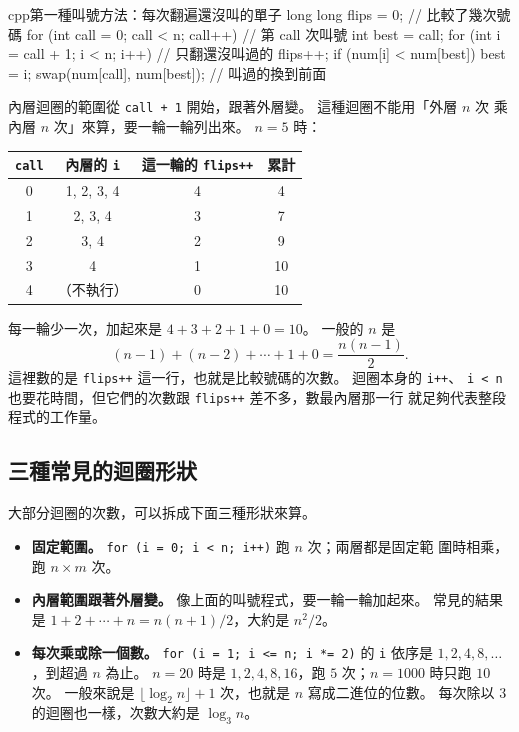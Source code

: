 \begin{code}[label=code:call-loop]{cpp}{第一種叫號方法：每次翻遍還沒叫的單子}
long long flips = 0;                      // 比較了幾次號碼
for (int call = 0; call < n; call++) {    // 第 call 次叫號
    int best = call;
    for (int i = call + 1; i < n; i++) {  // 只翻還沒叫過的
        flips++;
        if (num[i] < num[best]) {
            best = i;
        }
    }
    swap(num[call], num[best]);           // 叫過的換到前面
}
\end{code}

內層迴圈的範圍從 \texttt{call + 1} 開始，跟著外層變。 這種迴圈不能用「外層 $n$ 次
乘內層 $n$ 次」來算，要一輪一輪列出來。 $n = 5$ 時：

\begin{center}
\begin{tabular}{cccc}
\toprule
\texttt{call} & 內層的 \texttt{i} & 這一輪的 \texttt{flips++} & 累計 \\
\midrule
0 & 1, 2, 3, 4 & 4 & 4 \\
1 & 2, 3, 4 & 3 & 7 \\
2 & 3, 4 & 2 & 9 \\
3 & 4 & 1 & 10 \\
4 & （不執行） & 0 & 10 \\
\bottomrule
\end{tabular}
\end{center}

每一輪少一次，加起來是 $4 + 3 + 2 + 1 + 0 = 10$。 一般的 $n$ 是
\[
(n - 1) + (n - 2) + \cdots + 1 + 0 = \frac{n(n - 1)}{2}.
\]
這裡數的是 \texttt{flips++} 這一行，也就是比較號碼的次數。 迴圈本身的 \texttt{i++}、
\texttt{i < n} 也要花時間，但它們的次數跟 \texttt{flips++} 差不多，數最內層那一行
就足夠代表整段程式的工作量。

\subsection{三種常見的迴圈形狀}

大部分迴圈的次數，可以拆成下面三種形狀來算。

\begin{itemize}
\item \textbf{固定範圍。} \texttt{for (i = 0; i < n; i++)} 跑 $n$ 次；兩層都是固定範
圍時相乘，跑 $n \times m$ 次。
\item \textbf{內層範圍跟著外層變。} 像上面的叫號程式，要一輪一輪加起來。 常見的結果
是 $1 + 2 + \cdots + n = n(n + 1)/2$，大約是 $n^2/2$。
\item \textbf{每次乘或除一個數。} \texttt{for (i = 1; i <= n; i *= 2)} 的 \texttt{i}
依序是 $1, 2, 4, 8, \ldots$，到超過 $n$ 為止。 $n = 20$ 時是 $1, 2, 4, 8, 16$，跑
$5$ 次；$n = 1000$ 時只跑 $10$ 次。 一般來說是 $\lfloor \log_2 n \rfloor + 1$
次，也就是 $n$ 寫成二進位的位數。 每次除以 $3$ 的迴圈也一樣，次數大約是
$\log_3 n$。
\end{itemize}

